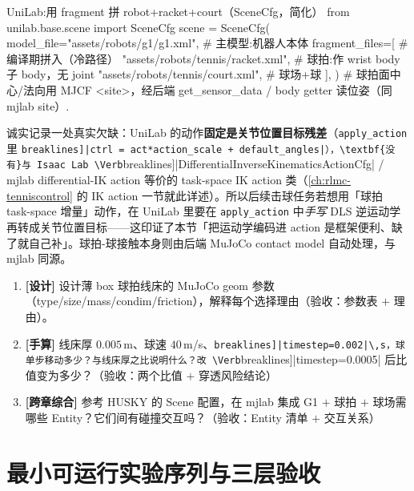 \begin{codebox}[Python]{UniLab:用 fragment 拼 robot+racket+court（SceneCfg，简化）}
from unilab.base.scene import SceneCfg
scene = SceneCfg(
    model_file="assets/robots/g1/g1.xml",          # 主模型:机器人本体
    fragment_files=[                                # 编译期拼入（冷路径）
        "assets/robots/tennis/racket.xml",         # 球拍:作 wrist body 子 body，无 joint
        "assets/robots/tennis/court.xml",          # 球场+球
    ],
)
# 球拍面中心/法向用 MJCF <site>，经后端 get_sensor_data / body getter 读位姿（同 mjlab site）.
\end{codebox}

诚实记录一处真实欠缺：UniLab 的动作\textbf{固定是关节位置目标残差}（\verb|apply_action| 里 \Verb[breaklines]|ctrl = act*action_scale + default_angles|），\textbf{没有}与 Isaac Lab \Verb[breaklines]|DifferentialInverseKinematicsActionCfg| / mjlab differential-IK action 等价的 task-space IK action 类（\cref{ch:rlmc-tenniscontrol} 的 IK action 一节就此详述）。所以后续击球任务若想用「球拍 task-space 增量」动作，在 UniLab 里要在 \verb|apply_action| 中\emph{手写} DLS 逆运动学再转成关节位置目标——这印证了本节「把运动学编码进 action 是框架便利、缺了就自己补」。球拍-球接触本身则由后端 MuJoCo contact model 自动处理，与 mjlab 同源。

\begin{practice}[本节动手任务]
\begin{enumerate}
  \item \textbf{[设计]} 设计薄 box 球拍线床的 MuJoCo geom 参数（type/size/mass/condim/friction），解释每个选择理由（验收：参数表 $+$ 理由）。
  \item \textbf{[手算]} 线床厚 $0.005$\,m、球速 $40$\,m/s、\Verb[breaklines]|timestep=0.002|\,s，球单步移动多少？与线床厚之比说明什么？改 \Verb[breaklines]|timestep=0.0005| 后比值变为多少？（验收：两个比值 $+$ 穿透风险结论）
  \item \textbf{[跨章综合]} 参考 HUSKY 的 Scene 配置，在 mjlab 集成 G1 $+$ 球拍 $+$ 球场需哪些 Entity？它们间有碰撞交互吗？（验收：Entity 清单 $+$ 交互关系）
\end{enumerate}
\end{practice}

\section{最小可运行实验序列与三层验收}
\label{sec:rlmc-tennis-suite}

